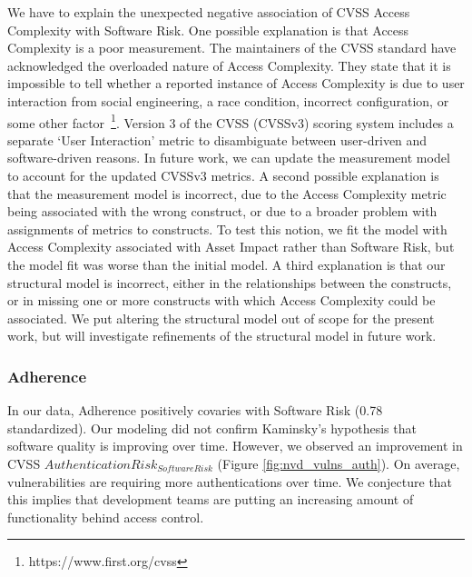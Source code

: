 We have to explain the unexpected negative association of CVSS Access Complexity with Software Risk. One possible explanation is that Access Complexity is a poor measurement. The maintainers of the CVSS standard have acknowledged the overloaded nature of Access Complexity. They state that it is impossible to tell whether a reported instance of Access Complexity is due to user interaction from social engineering, a race condition, incorrect configuration, or some other factor~\footnote{https://www.first.org/cvss}. Version 3 of the CVSS (CVSSv3) scoring system includes a separate `User Interaction' metric to disambiguate between user-driven and software-driven reasons. In future work, we can update the measurement model to account for the updated CVSSv3 metrics. A second possible explanation is that the measurement model is incorrect, due to the Access Complexity metric being associated with the wrong construct, or due to a broader problem with assignments of metrics to constructs. To test this notion, we fit the model with Access Complexity associated with Asset Impact rather than Software Risk, but the model fit was worse than the initial model. A third explanation is that our structural model is incorrect, either in the relationships between the constructs, or in missing one or more constructs with which Access Complexity could be associated. We put altering the structural model out of scope for the present work, but will investigate refinements of the structural model in future work. 

\subsubsection{Adherence}
In our data, Adherence positively covaries with Software Risk (0.78 standardized). Our modeling did not confirm Kaminsky's hypothesis that software quality is improving over time. However, we observed an improvement in CVSS $Authentication Risk_{Software Risk}$ (Figure \ref{fig:nvd_vulns_auth}). On average, vulnerabilities are requiring more authentications over time. We conjecture that this implies that development teams are putting an increasing amount of functionality behind access control.

